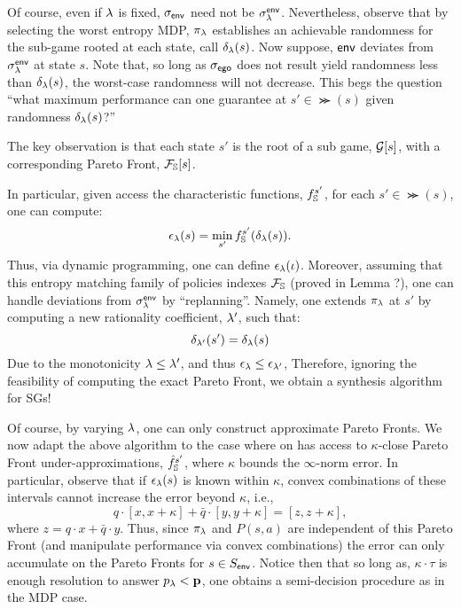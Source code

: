 Of course, even if $\lambda$ is fixed, ${\sigma_{\mathsf{env}}}$ need not be
$\sigma^{\mathsf{env}}_\lambda$. Nevertheless, observe that by selecting the worst
entropy MDP, $\pi_\lambda$ establishes an achievable randomness for the
sub-game rooted at each state, call $\delta_\lambda(s)$. Now suppose,
$\mathsf{env}$ deviates from $\sigma_\lambda^{\mathsf{env}}$ at state $s$. Note that, so
long as ${\sigma_{\mathsf{ego}}}$ does not result yield randomness less than
$\delta_\lambda(s)$, the worst-case randomness will not decrease.
This begs the question ``what maximum performance can one guarantee at $s' \in
\Succ(s)$ given randomness $\delta_\lambda(s)$?''
\begin{mdframed}
  The key observation is that each state $s'$ is the root of a sub
  game, $\mathcal{G}[s]$, with a corresponding Pareto Front,
  $\mathcal{F}_{\mathbb{S}}[s]$.
\end{mdframed}
In particular, given access the characteristic functions,
$f_{\mathbb{S}}^{s'}$, for each $s' \in \Succ(s)$, one can compute:
\begin{equation}\label{eq:performance_lookup}
  \epsilon_\rat(s) = \min_{s'} f_\solutions^{s'}(\delta_\rat(s)).
\end{equation}
Thus, via dynamic programming, one can define $\epsilon_\lambda(\iota)$.
Moreover, assuming that this entropy matching family of policies
indexes $\mathcal{F}_{\mathbb{S}}$ (proved in Lemma ?), one can handle
deviations from $\sigma^{\mathsf{env}}_\lambda$ by ``replanning''. Namely, one
extends $\pi_\lambda$ at $s'$ by computing a new rationality coefficient,
$\lambda'$, such that:
\begin{equation}
  \delta_{\lambda'}(s') = \delta_{\lambda}(s)
\end{equation}
Due to the monotonicity $\lambda \leq \lambda'$, and thus $\epsilon_\lambda \leq \epsilon_{\lambda'}$, 
Therefore, ignoring the feasibility of computing the exact Pareto
Front, we obtain a synthesis algorithm for SGs!

Of course, by varying $\lambda$, one can only construct approximate
Pareto Fronts. We now
adapt the above algorithm to the case where on has access to
$\kappa$-close Pareto Front under-approximations,
$\hat{f}_{\mathbb{S}}^{s'}$, where $\kappa$ bounds the $\infty$-norm
error. In particular, observe that if $\epsilon_\lambda(s)$ is known
within $\kappa$, convex combinations of these intervals cannot
increase the error beyond $\kappa$, i.e.,
\begin{equation}
  q\cdot[x, x + \kappa] + \bar{q}\cdot[y, y + \kappa] = [z, z + \kappa],
\end{equation}
where $z = q\cdot x + \bar{q}\cdot y$. Thus, since $\pi_\lambda$ and
$P(s, a)$ are independent of this Pareto Front (and manipulate
performance via convex combinations) the error can only accumulate on
the Pareto Fronts for $s \in S_{\mathsf{env}}$. Notice then that so long as,
$\kappa\cdot\tau$ is enough resolution to answer $p_\lambda <
\mathbf{p}$, one obtains a semi-decision procedure as in the MDP
case.

